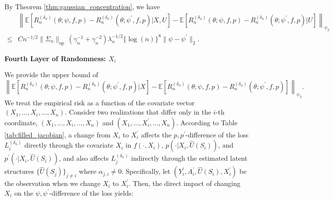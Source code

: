 \documentclass[12pt]{article}
\newcommand{\E}{\mathbb{E}}
\begin{document}
By Theorem \ref{thm:gaussian_concentration}, we have
\begin{align*}
    &\left\|\E\left[R_n^{(\delta_n)}(\theta;\psi,f,p)-R_n^{({\delta_n})}(\theta;\psi^\prime,f,p)|X,U\right]-\E\left[R_n^{(\delta_n)}(\theta;\psi,f,p)-R_n^{({\delta_n})}(\theta;\psi^\prime,f,p)|U\right]\right\|_{\psi_2}\\
    \leq & Cn^{-1/2}\|\Sigma_n\|_{\mathrm{op}}\,(\gamma_n^{-1}+\gamma_n^{-2})\lambda_n^{-1/2}\{\log(n)\}^8\|\psi - \psi^\prime\|_2.
\end{align*}

\noindent\textbf{Fourth Layer of Randomness: $X_i$}

\noindent We provide the upper bound of
$$\left\|\E\left[R_n^{(\delta_n)}(\theta;\psi,f,p)-R_n^{({\delta_n})}(\theta;\psi^\prime,f,p)|X\right]-\E\left[R_n^{(\delta_n)}(\theta;\psi,f,p)-R_n^{({\delta_n})}(\theta;\psi^\prime,f,p)\right]\right\|_{\psi_2}.$$
We treat the empirical risk as a function of the covariate vector $(X_1, \ldots,X_i,\ldots, X_n)$. Consider two realizations that differ only in the $i$-th coordinate, $(X_1, \ldots,X_i,\ldots, X_n)$ and $(X_1, \ldots,X_i^\prime,\ldots, X_n)$. According to Table \ref{tab:filled_jacobian}, a change from $X_i$ to $X_i^\prime$ affects the $p,p^\prime$-difference of the loss $L_i^{(\delta_n)}$ directly through the covariate $X_i$ in $f(\cdot,X_i)$, $p(\cdot|X_i,\widehat U(S_i))$, and $p^\prime(\cdot|X_i,\widehat U(S_i))$, and also affects $L_j^{(\delta_n)}$ indirectly through the estimated latent structures $\{\widehat U(S_j)\}_{j\neq i}$ where $\alpha_{j,i}\neq 0$. Specifically, let $(Y_i^\prime,A_i^\prime,\widehat U(S_i),X_i^\prime)$ be the observation when we change $X_i$ to $X_i^\prime$. Then, the direct impact of changing $X_i$ on the $\psi,\psi^\prime$-difference of the loss yields:
\end{document}
